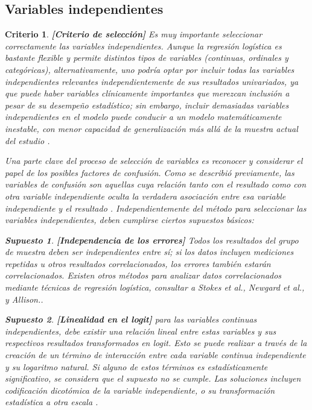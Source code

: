 \documentclass[12pt]{article}
\newtheorem{Criterio}{Criterio}%
\newtheorem{Sup}{Supuesto}%
\begin{document}
\subsection{Variables independientes}
\begin{Criterio}
\textbf{[Criterio de selecci\'on]} Es muy importante seleccionar correctamente las variables independientes. Aunque la regresi\'on log\'istica es bastante flexible y permite distintos tipos de variables (continuas, ordinales y categ\'oricas), alternativamente, uno podr\'ia optar por incluir todas las variables independientes relevantes independientemente de sus resultados univariados, ya que puede haber variables cl\'inicamente importantes que merezcan inclusi\'on a pesar de su desempe\~no estad\'istico; sin embargo,  incluir demasiadas variables independientes en el modelo puede conducir a un modelo matem\'aticamente inestable, con menor capacidad de generalizaci\'on m\'as all\'a de la muestra actual del estudio \cite{tabachnick2007,hosmer2000}.\medskip

Una parte clave del proceso de selecci\'on de variables es reconocer y considerar el papel de los posibles factores de confusi\'on. Como se describi\'o previamente, las variables de confusi\'on son aquellas cuya relaci\'on tanto con el resultado como con otra variable independiente oculta la verdadera asociaci\'on entre esa variable independiente y el resultado \cite{darlington1990,hosmer2000}. Independientemente del m\'etodo para seleccionar las variables independientes, deben cumplirse ciertos supuestos b\'asicos: 

\begin{Sup}
\textbf{[Independencia de los errores]} Todos los resultados del grupo de muestra deben ser independientes entre s\'i; si los datos incluyen mediciones repetidas u otros resultados correlacionados, los errores tambi\'en estar\'an correlacionados. Existen otros m\'etodos para analizar datos correlacionados mediante t\'ecnicas de regresi\'on log\'istica, consultar a Stokes et al.,\cite{stokes2000} Newgard et al.,\cite{newgard2004, newgard2007} y Allison.\cite{allison1999}.
\end{Sup}

\begin{Sup} \textbf{[Linealidad en el logit]} para las variables continuas independientes, debe existir una relaci\'on lineal entre estas variables y sus respectivos resultados transformados en logit. Esto se puede realizar a trav\'es de la creaci\'on de un t\'ermino de interacci\'on entre cada variable continua independiente y su logaritmo natural. Si alguno de estos t\'erminos es estad\'isticamente significativo, se considera que el supuesto no se cumple. Las soluciones incluyen codificaci\'on dicot\'omica de la variable independiente,\cite{hosmer2000} o su transformaci\'on estad\'istica a otra escala \cite{tabachnick2007,hosmer2000}.
\end{Sup}


\end{Criterio}
\end{document}
